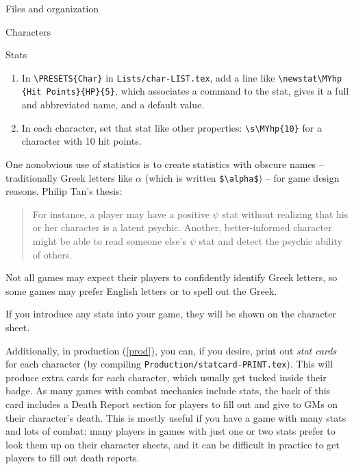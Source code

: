 \documentclass[sheet]{GameTexBase}
\begin{document}
\begin{section}{Files and organization}
\begin{subsection}{Characters}
\begin{subsubsection}{Stats}
\begin{enumerate}
\item In \lstinline|\PRESETS{Char}| in \lstinline|Lists/char-LIST.tex|, add a line like \lstinline|\newstat\MYhp	{Hit Points}{HP}{5}|, which associates a command to the stat, gives it a full and abbreviated name, and a default value.
\item In each character, set that stat like other properties: \lstinline|\s\MYhp{10}| for a character with 10 hit points.
\end{enumerate}

One nonobvious use of statistics is to create statistics with obscure names -- traditionally Greek letters like $\alpha$ (which is written \lstinline|$\alpha$|) -- for game design reasons.  Philip Tan's thesis:
\begin{quote}
For instance, a player may have a positive $\psi$ stat without realizing that his
or her character is a latent psychic. Another, better-informed character might be able to
read someone else’s $\psi$ stat and detect the psychic ability of others.
\end{quote}
Not all games may expect their players to confidently identify Greek letters, so some games may prefer English letters or to spell out the Greek.

If you introduce any stats into your game, they will be shown on the character sheet.  

Additionally, in production (\ref{prod}), you can, if you desire, print out \emph{stat cards} for each character (by compiling \lstinline|Production/statcard-PRINT.tex|).  This will produce extra cards for each character, which usually get tucked inside their badge.  As many games with combat mechanics include stats, the back of this card includes a Death Report section for players to fill out and give to GMs on their character's death.  This is mostly useful if you have a game with many stats and lots of combat: many players in games with just one or two stats prefer to look them up on their character sheets, and it can be difficult in practice to get players to fill out death reports.


\end{subsubsection}
\end{subsection}
\end{section}
\end{document}
